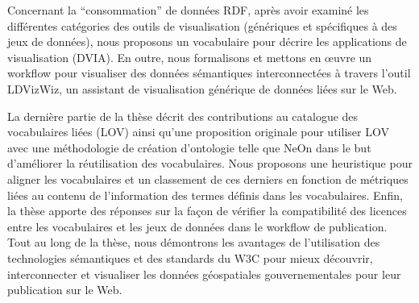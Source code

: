 \documentclass[a4paper,11pt,twoside]{report}
\begin{document}
Concernant la ``consommation'' de données RDF, après avoir examiné les différentes catégories des outils de visualisation (génériques et spécifiques à des jeux de données), nous proposons un vocabulaire pour décrire les applications de visualisation (DVIA). En outre, nous formalisons et mettons en œuvre un workflow pour visualiser des données sémantiques interconnectées à travers l'outil LDVizWiz, un assistant de visualisation générique de données liées sur le Web.

La dernière partie de la thèse décrit des contributions au catalogue des vocabulaires liées (LOV) ainsi qu'une proposition originale pour utiliser LOV avec une méthodologie de création d'ontologie telle que NeOn dans le but d'améliorer la réutilisation des vocabulaires. Nous proposons une heuristique pour aligner les vocabulaires et un classement de ces derniers en fonction de métriques liées au contenu de l'information des termes définis dans les vocabulaires. Enfin, la thèse apporte des réponses sur la façon de vérifier la compatibilité des licences entre les vocabulaires et les jeux de données dans le workflow de publication. Tout au long de la thèse, nous démontrons les avantages de l'utilisation des technologies sémantiques et des standards du W3C pour mieux découvrir, interconnecter et visualiser les données géospatiales gouvernementales pour leur publication sur le Web.
\end{document}

